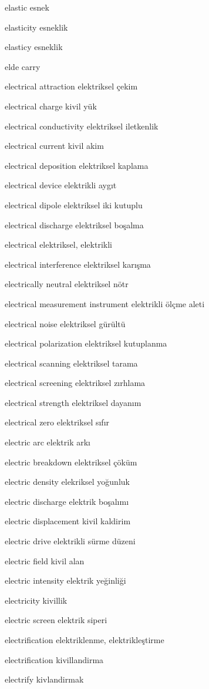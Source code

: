 \documentclass[12pt,fleqn]{article}\usepackage{../../common}
\begin{document}
elastic esnek

elasticity esneklik

elasticy esneklik

elde carry

electrical attraction elektriksel çekim

electrical charge kivil yük

electrical conductivity elektriksel iletkenlik

electrical current kivil akim

electrical deposition elektriksel kaplama

electrical device elektrikli aygıt

electrical dipole elektriksel iki kutuplu

electrical discharge elektriksel boşalma

electrical elektriksel, elektrikli

electrical interference elektriksel karışma

electrically neutral elektriksel nötr

electrical measurement instrument elektrikli ölçme aleti

electrical noise elektriksel gürültü

electrical polarization elektriksel kutuplanma

electrical scanning elektriksel tarama

electrical screening elektriksel zırhlama

electrical strength elektriksel dayanım

electrical zero elektriksel sıfır

electric arc elektrik arkı

electric breakdown elektriksel çöküm

electric density elekriksel yoğunluk

electric discharge elektrik boşalımı

electric displacement kivil kaldirim

electric drive elektrikli sürme düzeni

electric field kivil alan

electric intensity elektrik yeğinliği

electricity kivillik

electric screen elektrik siperi

electrification elektriklenme, elektrikleştirme

electrification kivillandirma

electrify kivlandirmak
\end{document}
